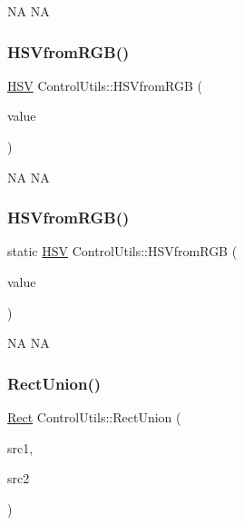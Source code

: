 NA  NA \mbox{\label{classControlUtils_a4768aeeefc97af0e2afabac90bc92ee5}} 
\subsubsection{\texorpdfstring{H\+S\+Vfrom\+R\+G\+B()}{HSVfromRGB()}\hspace{0.1cm}{\footnotesize\ttfamily [1/2]}}
{\footnotesize\ttfamily \hyperlink{structHSV}{H\+SV} Control\+Utils\+::\+H\+S\+Vfrom\+R\+GB (\begin{DoxyParamCaption}\item[{\hyperlink{structRGBA}{R\+G\+BA}}]{value }\end{DoxyParamCaption})\hspace{0.3cm}{\ttfamily [static]}}

NA  NA \mbox{\label{classControlUtils_a4b04cec4678408746b3c81b8e1fa8afe}} 
\subsubsection{\texorpdfstring{H\+S\+Vfrom\+R\+G\+B()}{HSVfromRGB()}\hspace{0.1cm}{\footnotesize\ttfamily [2/2]}}
{\footnotesize\ttfamily static \hyperlink{structHSV}{H\+SV} Control\+Utils\+::\+H\+S\+Vfrom\+R\+GB (\begin{DoxyParamCaption}\item[{\hyperlink{structRGBA}{R\+G\+BA}}]{value }\end{DoxyParamCaption})\hspace{0.3cm}{\ttfamily [static]}}

NA  NA \mbox{\label{classControlUtils_af036ce9e54220e5cb5cef86263aac02e}} 
\subsubsection{\texorpdfstring{Rect\+Union()}{RectUnion()}\hspace{0.1cm}{\footnotesize\ttfamily [1/2]}}
{\footnotesize\ttfamily \hyperlink{classRect}{Rect} Control\+Utils\+::\+Rect\+Union (\begin{DoxyParamCaption}\item[{const \hyperlink{classRect}{Rect} \&}]{src1,  }\item[{const \hyperlink{classRect}{Rect} \&}]{src2 }\end{DoxyParamCaption})\hspace{0.3cm}{\ttfamily [static]}}

